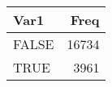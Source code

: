 \begin{table}[H]
\centering
\begin{tabular}[t]{lr}
\toprule
Var1 & Freq\\
\midrule
FALSE & 16734\\
TRUE & 3961\\
\bottomrule
\end{tabular}
\end{table}